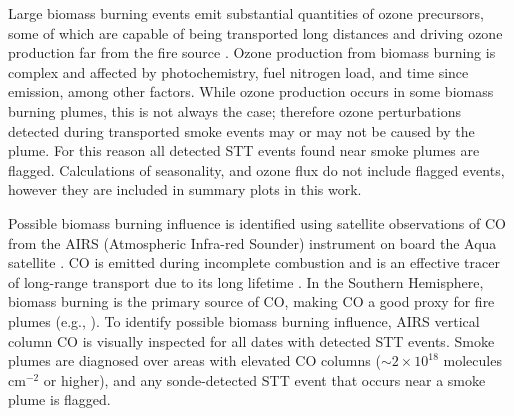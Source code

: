     Large biomass burning events emit substantial quantities of ozone precursors, some of which are capable of being transported long distances and driving ozone production far from the fire source \citep{Jaffe2012}.
    Ozone production from biomass burning is complex and affected by photochemistry, fuel nitrogen load, and time since emission, among other factors. 
    While ozone production occurs in some biomass burning plumes, this is not always the case; therefore ozone perturbations detected during transported smoke events may or may not be caused by the plume.
    For this reason all detected STT events found near smoke plumes are flagged.
    Calculations of seasonality, and ozone flux do not include flagged events, however they are included in summary plots in this work.
    
    
    Possible biomass burning influence is identified using satellite observations of CO from the AIRS (Atmospheric Infra-red Sounder) instrument on board the Aqua satellite \citep{AIRS3STD}.
    CO is emitted during incomplete combustion and is an effective tracer of long-range transport due to its long lifetime \citep{Edwards2003, Edwards2006}.
    In the Southern Hemisphere, biomass burning is the primary source of CO, making CO a good proxy for fire plumes (e.g., \citet{Sinha2004, Mari2008}).
    To identify possible biomass burning influence, AIRS vertical column CO is visually inspected for all dates with detected STT events.
    Smoke plumes are diagnosed over areas with elevated CO columns ($\sim 2 \times 10^{18}$ molecules cm$^{-2}$ or higher), and any sonde-detected STT event that occurs near a smoke plume is flagged.

